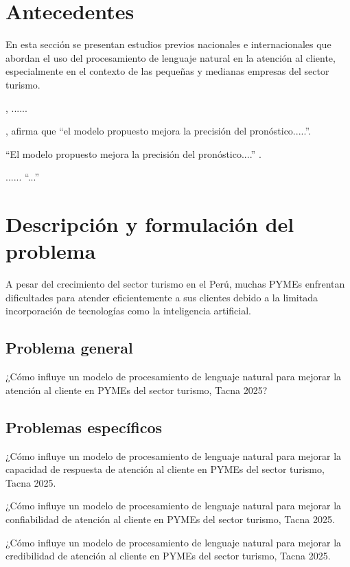 
\section{Antecedentes}
En esta sección se presentan estudios previos nacionales e internacionales que abordan el uso del procesamiento de lenguaje natural en la atención al cliente, especialmente en el contexto de las pequeñas y medianas empresas del sector turismo.


\textcite{Akhtar}, ......


\textcite{Akhtar}, afirma que ``el modelo propuesto mejora la precisión del pronóstico.....''.

``El modelo propuesto mejora la precisión del pronóstico....'' \parencite[p. 45]{Bailey}.

\parencite{Bhandari1997} ...... ``...''

\section{Descripción y formulación del problema}
A pesar del crecimiento del sector turismo en el Perú, muchas PYMEs enfrentan dificultades para atender eficientemente a sus clientes debido a la limitada incorporación de tecnologías como la inteligencia artificial.  

\subsection{Problema general}
¿Cómo influye un modelo de procesamiento de lenguaje natural para mejorar la atención al cliente en PYMEs del sector turismo, Tacna 2025?

\subsection{Problemas específicos}
¿Cómo influye un modelo de procesamiento de lenguaje natural para mejorar la capacidad de respuesta de atención al cliente en PYMEs del sector turismo, Tacna 2025.

¿Cómo influye un modelo de procesamiento de lenguaje natural para mejorar la confiabilidad de atención al cliente en PYMEs del sector turismo, Tacna 2025.

¿Cómo influye un modelo de procesamiento de lenguaje natural para mejorar la credibilidad de atención al cliente en PYMEs del sector turismo, Tacna 2025.


